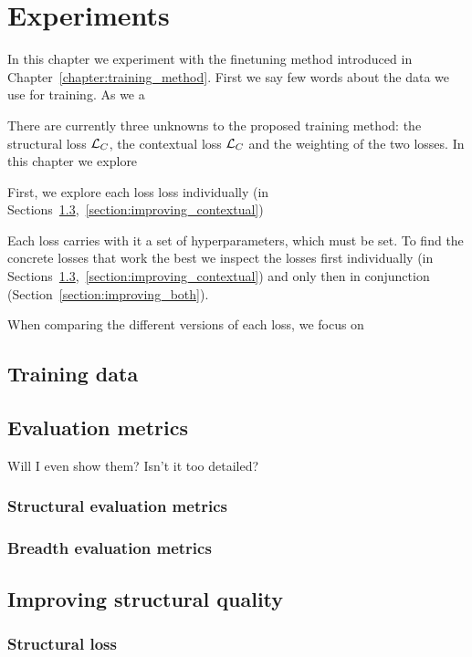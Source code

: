 \chapter{Experiments}\label{chapter:experiments}

In this chapter we experiment with the finetuning method introduced in
Chapter~\ref{chapter:training_method}. First we say few words about the data we
use for training. As we a

There are currently three
unknowns to the proposed training method: the structural loss $\mathcal{L}_C$, the
contextual loss $\mathcal{L}_C$ and the weighting of the two losses. In this chapter
we explore

First, we explore
each loss loss individually (in
Sections~\ref{section:improving_structural},~\ref{section:improving_contextual})

Each loss carries with it a set of hyperparameters, which must be set. To find
the concrete losses that work the best we inspect the losses first individually
(in
Sections~\ref{section:improving_structural},~\ref{section:improving_contextual})
and only then in conjunction (Section~\ref{section:improving_both}).

When comparing the different versions of each loss, we focus on

\section{Training data}


\section{Evaluation metrics}

Will I even show them? Isn't it too detailed?


\subsection{Structural evaluation metrics}
\subsection{Breadth evaluation metrics}

\section{Improving structural quality}\label{section:improving_structural}

\subsection{Structural loss}\label{section:structural_loss}

